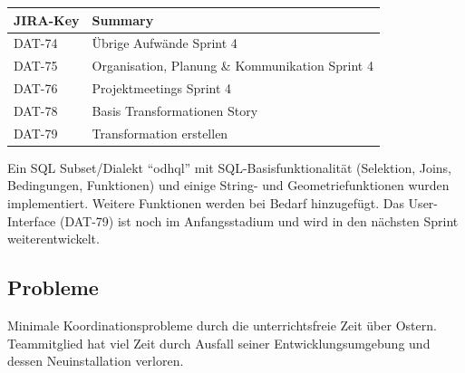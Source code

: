 \begin{table}[H]	
\centering
\begin{tabular}{ll}
	\toprule
	\textbf{JIRA-Key} & \textbf{Summary}\\
	\midrule
DAT-74 & Übrige Aufwände Sprint 4\\
DAT-75 & Organisation, Planung \& Kommunikation Sprint 4\\
DAT-76 & Projektmeetings Sprint 4\\
DAT-78 & Basis Transformationen	Story\\
DAT-79 & Transformation erstellen\\
	\bottomrule
\end{tabular}	
\end{table}

Ein SQL Subset/Dialekt ``\acs{odhql}'' mit SQL-Basisfunktionalität (Selektion, Joins, Bedingungen, Funktionen) und einige String- und Geometriefunktionen wurden implementiert. Weitere Funktionen werden bei Bedarf hinzugefügt. Das User-Interface (DAT-79) ist noch im Anfangsstadium und wird in den nächsten Sprint weiterentwickelt.

\subsection{Probleme}
Minimale Koordinationsprobleme durch die unterrichtsfreie Zeit über Ostern. Teammitglied \rlif hat viel Zeit durch Ausfall seiner Entwicklungsumgebung und dessen Neuinstallation verloren.
